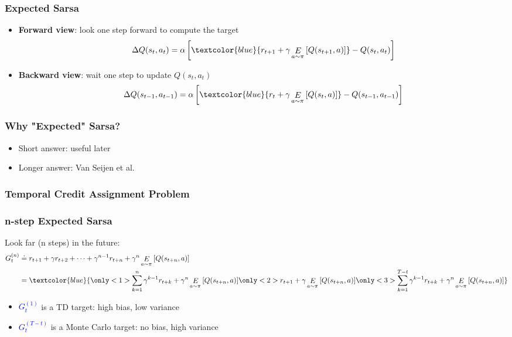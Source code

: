 \documentclass{beamer}
\newcommand{\expect}[2]{\mathop{E}_{#1}\left[#2\right]}
\begin{document}
\begin{frame}
\frametitle{Expected Sarsa}
\begin{itemize}
\item<1-> \textbf{Forward view}: look one step forward to compute the target
\[
	\Delta Q(s_t,a_t) = \alpha\left[\textcolor{blue}{r_{t+1} + \gamma\expect{a\sim\pi}{Q(s_{t+1},a)}} - Q(s_t,a_t)\right]
\]
\item<2> \textbf{Backward view}: wait one step to update $Q(s_t,a_t)$
\begin{align*}
	\Delta Q(s_{t-1},a_{t-1}) = \alpha\left[
	\textcolor{blue}{r_t + \gamma\expect{a\sim\pi}{Q(s_t,a)}} - Q(s_{t-1},a_{t-1})\right] 
\end{align*}
\end{itemize}
\end{frame}

\begin{frame}
\frametitle{Why "Expected" Sarsa?}
\begin{itemize}
\item Short answer: useful later
\item Longer answer: Van Seijen et al. \cite{van2009theoretical}
\end{itemize}
\end{frame}

\begin{frame}
\frametitle{Temporal Credit Assignment Problem}
\end{frame}

\begin{frame}
\frametitle{n-step Expected Sarsa}
Look far (n steps) in the future:
\begin{align*}
	G_t^{(n)} &\doteq r_{t+1} + \gamma r_{t+2} + \dots + \gamma^{n-1}r_{t+n}
		+ \gamma^n\expect{a\sim\pi}{Q(s_{t+n},a)} \\
		& = \textcolor{blue}{
		\only<1>{
		\sum_{k=1}^{n}\gamma^{k-1}r_{t+k} + \gamma^n\expect{a\sim\pi}{Q(s_{t+n},a)}
		}\only<2>{
		r_{t+1}+\gamma\expect{a\sim\pi}{Q(s_{t+n},a)}
		}\only<3>{
		\sum_{k=1}^{T-t}\gamma^{k-1}r_{t+k} + \gamma^n\expect{a\sim\pi}{Q(s_{t+n},a)}}
		}
\end{align*}
\begin{itemize}
\item<2,4> \textcolor{blue}{$G_t^{(1)}$} is a TD target: high bias, low variance
\item<3-> \textcolor{blue}{$G_t^{(T-t)}$} is a Monte Carlo target: no bias, high variance
\end{itemize}
\end{frame}
\end{document}
